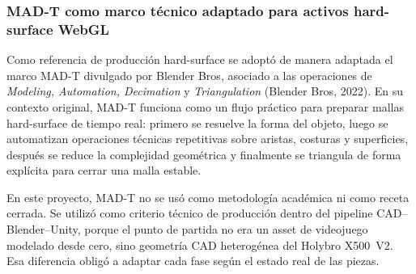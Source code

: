 \subsubsection{MAD-T como marco técnico adaptado para activos hard-surface WebGL}

Como referencia de producción hard-surface se adoptó de manera adaptada el marco MAD-T divulgado por Blender Bros, asociado a las operaciones de \textit{Modeling, Automation, Decimation} y \textit{Triangulation} (Blender Bros, 2022). En su contexto original, MAD-T funciona como un flujo práctico para preparar mallas hard-surface de tiempo real: primero se resuelve la forma del objeto, luego se automatizan operaciones técnicas repetitivas sobre aristas, costuras y superficies, después se reduce la complejidad geométrica y finalmente se triangula de forma explícita para cerrar una malla estable.

En este proyecto, MAD-T no se usó como metodología académica ni como receta cerrada. Se utilizó como criterio técnico de producción dentro del pipeline CAD--Blender--Unity, porque el punto de partida no era un asset de videojuego modelado desde cero, sino geometría CAD heterogénea del Holybro X500~V2. Esa diferencia obligó a adaptar cada fase según el estado real de las piezas.

